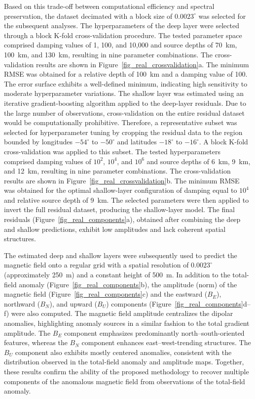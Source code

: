 \documentclass[a4paper,oneside,10pt]{book}
\begin{document}
Based on this trade-off between computational efficiency and spectral
preservation, the dataset decimated with a block size of $0.0023^{\circ}$ was
selected for the subsequent analyses.
The hyperparameters of the deep layer were selected through a block K-fold
cross-validation procedure. The tested
parameter space comprised damping values of 1, 100, and 10,000 and source
depths of 70~km, 100~km, and 130~km, resulting in nine parameter combinations.
The cross-validation results are shown in
Figure~\ref{fig_real_crossvalidation}a. The minimum RMSE was obtained for a
relative depth of 100~km and a damping value of 100. The error surface exhibits
a well-defined minimum, indicating high sensitivity to moderate
hyperparameter variations.
The shallow layer was estimated using an iterative gradient-boosting
algorithm applied to the deep-layer residuals.
Due to the large number of observations, cross-validation on the entire
residual dataset would be computationally prohibitive. Therefore, a
representative subset was selected for hyperparameter tuning by cropping the
residual data to the region bounded by longitudes $-54^{\circ}$ to
$-50^{\circ}$ and latitudes $-18^{\circ}$ to $-16^{\circ}$.
A block K-fold cross-validation was applied to this subset.
The tested hyperparameters comprised damping
values of $10^{2}$, $10^{4}$, and $10^{6}$ and source depths of 6~km, 9~km, and
12~km, resulting in nine parameter combinations.
The cross-validation results are shown in
Figure~\ref{fig_real_crossvalidation}b. The minimum RMSE was obtained for the
optimal shallow-layer configuration of damping equal to $10^4$ and relative
source depth of 9~km.
The selected parameters were then applied to invert the full residual
dataset, producing the shallow-layer model. The final residuals
(Figure~\ref{fig_real_components}a), obtained
after combining the deep and shallow predictions, exhibit low amplitudes and
lack coherent spatial structures.

The estimated deep and shallow layers were subsequently used to predict the
magnetic field onto a regular grid with a spatial resolution of
$0.0023^{\circ}$ (approximately 250~m) and a
constant height of 500~m. In addition to the total-field anomaly
(Figure~\ref{fig_real_components}b), the amplitude (norm) of the magnetic field
(Figure~\ref{fig_real_components}c) and the eastward ($B_E$),
northward ($B_N$), and upward ($B_U$) components
(Figure~\ref{fig_real_components}d--f) were also computed.
The magnetic field amplitude centralizes the dipolar anomalies,
highlighting anomaly sources in a similar fashion to the total gradient
amplitude.
The $B_E$ component
emphasizes predominantly north--south-oriented features, whereas the $B_N$
component enhances east--west-trending structures. The $B_U$ component also
exhibits mostly centered anomalies, consistent with the distribution observed
in the total-field anomaly and amplitude maps. Together, these results confirm the ability
of the proposed methodology to recover multiple components of the anomalous
magnetic field from observations of the total-field anomaly.
\end{document}
